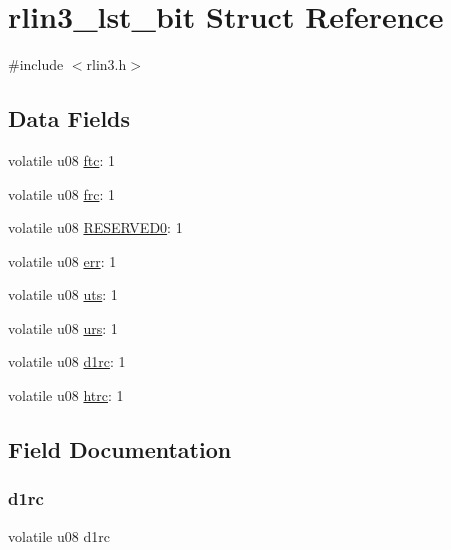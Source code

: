 \hypertarget{structrlin3__lst__bit}{}\section{rlin3\+\_\+lst\+\_\+bit Struct Reference}
\label{structrlin3__lst__bit}


{\ttfamily \#include $<$rlin3.\+h$>$}

\subsection*{Data Fields}
\begin{DoxyCompactItemize}
\item 
volatile u08 \mbox{\hyperlink{structrlin3__lst__bit_ab0562256e0ca2829a6088e516bbc3a07}{ftc}}\+: 1
\item 
volatile u08 \mbox{\hyperlink{structrlin3__lst__bit_ab1d162c140d34f6569fd8433f18e81ed}{frc}}\+: 1
\item 
volatile u08 \mbox{\hyperlink{structrlin3__lst__bit_a59c0b30ccfb89f1b34e9682741859abd}{R\+E\+S\+E\+R\+V\+E\+D0}}\+: 1
\item 
volatile u08 \mbox{\hyperlink{structrlin3__lst__bit_ad29b8e115402b09ee735088bb3a231fe}{err}}\+: 1
\item 
volatile u08 \mbox{\hyperlink{structrlin3__lst__bit_a3f5f7e9f7fa316f196a301d5a6002e42}{uts}}\+: 1
\item 
volatile u08 \mbox{\hyperlink{structrlin3__lst__bit_a530b27a56cb2bacad1c64882037bab6d}{urs}}\+: 1
\item 
volatile u08 \mbox{\hyperlink{structrlin3__lst__bit_a36277e174a6a73d0db8b9ef6d84ca68f}{d1rc}}\+: 1
\item 
volatile u08 \mbox{\hyperlink{structrlin3__lst__bit_a338709af70769735818d36b8c4c8527f}{htrc}}\+: 1
\end{DoxyCompactItemize}


\subsection{Field Documentation}
\mbox{\label{structrlin3__lst__bit_a36277e174a6a73d0db8b9ef6d84ca68f}} 
\subsubsection{\texorpdfstring{d1rc}{d1rc}}
{\footnotesize\ttfamily volatile u08 d1rc}


